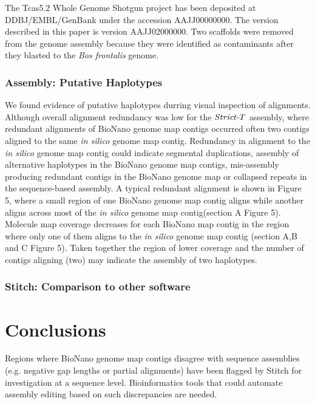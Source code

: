 \documentclass{bmcart}
\begin{document}
The Tcas5.2 Whole Genome Shotgun project has been deposited at DDBJ/EMBL/GenBank under the accession AAJJ00000000. The version described in this paper is version AAJJ02000000. Two scaffolds were removed from the genome assembly because they were identified as contaminants after they blasted to the \textit{Bos frontalis} genome.

\subsubsection*{Assembly: Putative Haplotypes}

We found evidence of putative haplotypes durring visual inspection of alignments. Although overall alignment redundancy was low for the $Strict\textnormal{-}T$ assembly, where redundant alignments of BioNano genome map contigs occurred often two contigs aligned to the same \textit{in silico} genome map contig. Redundancy in alignment to the \textit{in silico} genome map contig could indicate segmental duplications, assembly of alternative haplotypes in the BioNano genome map contigs, mis-assembly producing redundant contigs in the BioNano genome map or collapsed repeats in the sequence-based assembly. A typical redundant alignment is shown in Figure 5, where a small region of one BioNano genome map contig aligns while another aligns across most of the \textit{in silico} genome map contig(section A Figure 5). Molecule map coverage decreases for each BioNano map contig in the region where only one of them aligns to the \textit{in silico} genome map contig (section A,B and C Figure 5). Taken together the region of lower coverage and the number of contigs aligning (two) may indicate the assembly of two haplotypes. 

\subsubsection*{Stitch: Comparison to other software}

\section*{Conclusions}

Regions where BioNano genome map contigs disagree with sequence assemblies (e.g. negative gap lengths or partial alignments) have been flagged by Stitch for investigation at a sequence level. Bioinformatics tools that could automate assembly editing based on such discrepancies are needed. 
\end{document}
